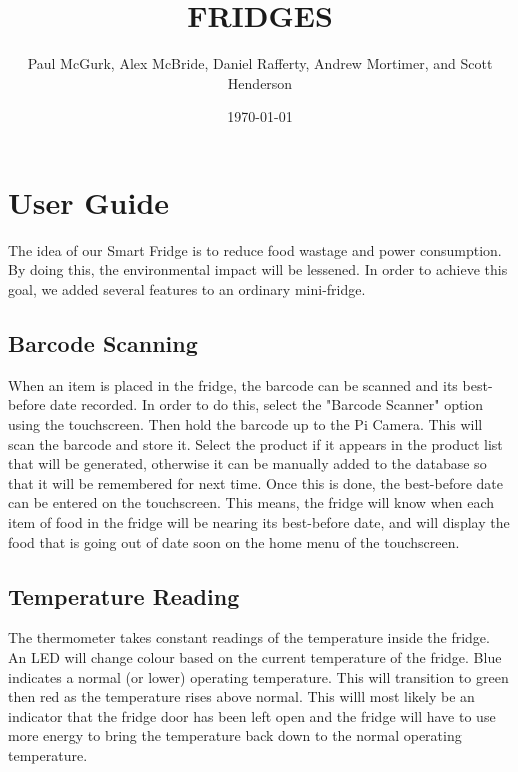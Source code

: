 \documentclass[10pt]{article}
\title{FRIDGES}
\author{Paul McGurk, Alex McBride, Daniel Rafferty, Andrew Mortimer, and Scott Henderson}
\date{\today}
\begin{document}
\begin{titlepage}
\maketitle
\end{titlepage}

\linespread{1.15} %
\renewcommand{\arraystretch}{1.2} %

\tableofcontents

\newpage
\section{User Guide}

The idea of our Smart Fridge is to reduce food wastage and power consumption. By doing this, the environmental impact will be lessened. In order to achieve this goal, we added several features to an ordinary mini-fridge.

\subsection{Barcode Scanning}
When an item is placed in the fridge, the barcode can be scanned and its best-before date recorded. In order to do this, select the "Barcode Scanner" option using the touchscreen. Then hold the barcode up to the Pi Camera. This will scan the barcode and store it. Select the product if it appears in the product list that will be generated, otherwise it can be manually added to the database so that it will be remembered  for next time. Once this is done, the best-before date can be entered on the touchscreen. This means, the fridge will know when each item of food in the fridge will be nearing its best-before date, and will display the food that is going out of date soon on the home menu of the touchscreen.

\subsection{Temperature Reading}
The thermometer takes constant readings of the temperature inside the fridge. An LED will change colour based on the current temperature of the fridge. Blue indicates a normal (or lower) operating temperature. This will transition to green then red as the temperature rises above normal. This willl most likely be an indicator that the fridge door has been left open and the fridge will have to use more energy to bring the temperature back down to the normal operating temperature.
\end{document}
